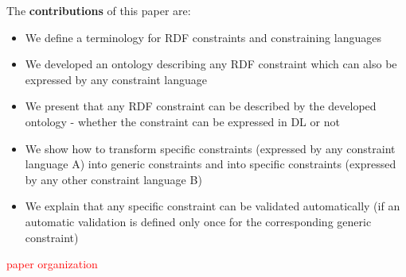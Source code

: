 \documentclass{llncs}
\begin{document}
The \textbf{contributions} of this paper are:
\begin{itemize}
	\item We define a terminology for RDF constraints and constraining languages
	\item We developed an ontology describing any RDF constraint which can also be expressed by any constraint language
	\item We present that any RDF constraint can be described by the developed ontology - whether the constraint can be expressed in DL or not 
	\item We show how to transform specific constraints (expressed by any constraint language A) into generic constraints and into specific constraints (expressed by any other constraint language B)
  \item We explain that any specific constraint can be validated automatically (if an automatic validation is defined only once for the corresponding generic constraint)
\end{itemize}


\textcolor{red}{paper organization}
\end{document}
